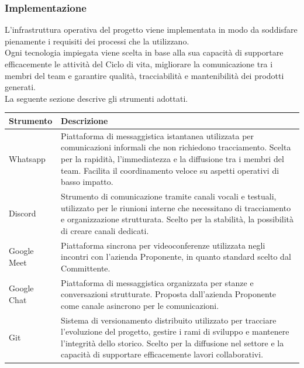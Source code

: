 \documentclass[a4paper,12pt]{article}
\begin{document}
\subsubsection{Implementazione}
L’infrastruttura operativa del progetto viene implementata in modo da soddisfare pienamente i requisiti dei processi che la utilizzano.\\ Ogni tecnologia impiegata viene scelta in base alla sua capacità di supportare efficacemente le attività del Ciclo di vita, migliorare la comunicazione tra i membri del team e garantire qualità, tracciabilità e mantenibilità dei prodotti generati.\\La seguente sezione descrive gli strumenti adottati.
\begin{center}
\small
{} 
\begin{longtable}{| m{3cm} | m{} |}
\hline
\rowcolor{gray!60}
{\centering \textbf{Strumento}\par} &
{\centering \textbf{Descrizione}\par} \\
\hline
\rowcolor{white}
\centering Whatsapp & Piattaforma di messaggistica istantanea utilizzata per comunicazioni informali che non richiedono tracciamento. Scelta per la rapidità, l’immediatezza e la diffusione tra i membri del team. Facilita il coordinamento veloce su aspetti operativi di basso impatto.\\
\hline
\rowcolor{gray!20}
\centering Discord & Strumento di comunicazione tramite canali vocali e testuali, utilizzato per le riunioni interne che necessitano di tracciamento e organizzazione strutturata. Scelto per la stabilità, la possibilità di creare canali dedicati.\\
\hline
\rowcolor{white}
\centering Google Meet & Piattaforma sincrona per videoconferenze utilizzata negli incontri con l’azienda Proponente, in quanto standard scelto dal Committente.\\
\hline
\rowcolor{gray!20}
\centering Google Chat & Piattaforma di messaggistica organizzata per stanze e conversazioni strutturate. Proposta dall'azienda Proponente come canale asincrono per le comunicazioni.\\
\hline
\rowcolor{white}
\centering Git & Sistema di versionamento distribuito utilizzato per tracciare l’evoluzione del progetto, gestire i rami di sviluppo e mantenere l’integrità dello storico. Scelto per la diffusione nel settore e la capacità di supportare efficacemente lavori collaborativi.\\
\hline

\end{longtable}
\end{center}
\end{document}
